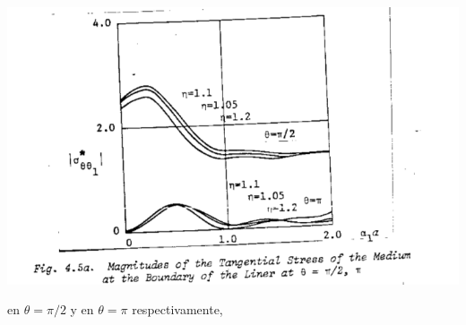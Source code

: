 \documentclass [11pt,spanish]{article}
\begin{document}
\includegraphics[scale=0.4]{res1}

en $\theta=\pi/2$ y en $\theta=\pi$ respectivamente,
\end{document}
